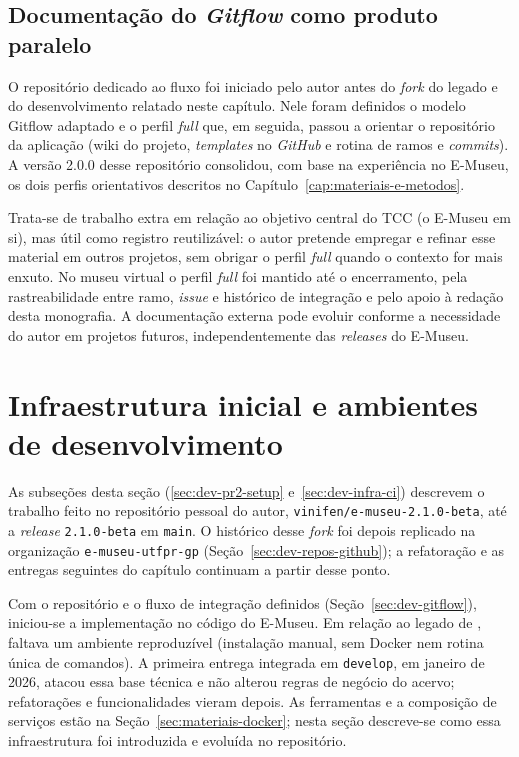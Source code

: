 \subsection{Documentação do \textit{Gitflow} como produto paralelo}\label{sec:dev-gitflow-doc}

O repositório dedicado ao fluxo \cite{gitflowdoc} foi iniciado pelo autor antes do \textit{fork} do legado e do desenvolvimento relatado neste capítulo. Nele foram definidos o modelo Gitflow adaptado e o perfil \textit{full} que, em seguida, passou a orientar o repositório da aplicação (wiki do projeto, \textit{templates} no \textit{GitHub} e rotina de ramos e \textit{commits}). A versão 2.0.0 desse repositório consolidou, com base na experiência no E-Museu, os dois perfis orientativos descritos no Capítulo~\ref{cap:materiais-e-metodos}.

Trata-se de trabalho extra em relação ao objetivo central do TCC (o E-Museu em si), mas útil como registro reutilizável: o autor pretende empregar e refinar esse material em outros projetos, sem obrigar o perfil \textit{full} quando o contexto for mais enxuto. No museu virtual o perfil \textit{full} foi mantido até o encerramento, pela rastreabilidade entre ramo, \textit{issue} e histórico de integração e pelo apoio à redação desta monografia. A documentação externa pode evoluir conforme a necessidade do autor em projetos futuros, independentemente das \textit{releases} do E-Museu.


\section{Infraestrutura inicial e ambientes de desenvolvimento}\label{sec:dev-infra}

As subseções desta seção (\ref{sec:dev-pr2-setup} e~\ref{sec:dev-infra-ci}) descrevem o trabalho feito no repositório pessoal do autor, \texttt{vinifen/e-museu-2.1.0-beta}, até a \textit{release} \texttt{2.1.0-beta} em \texttt{main}. O histórico desse \textit{fork} foi depois replicado na organização \texttt{e-museu-utfpr-gp} (Seção~\ref{sec:dev-repos-github}); a refatoração e as entregas seguintes do capítulo continuam a partir desse ponto.

Com o repositório e o fluxo de integração definidos (Seção~\ref{sec:dev-gitflow}), iniciou-se a implementação no código do E-Museu. Em relação ao legado de , faltava um ambiente reproduzível (instalação manual, sem Docker nem rotina única de comandos). A primeira entrega integrada em \texttt{develop}, em janeiro de 2026, atacou essa base técnica e não alterou regras de negócio do acervo; refatorações e funcionalidades vieram depois. As ferramentas e a composição de serviços estão na Seção~\ref{sec:materiais-docker}; nesta seção descreve-se como essa infraestrutura foi introduzida e evoluída no repositório.

